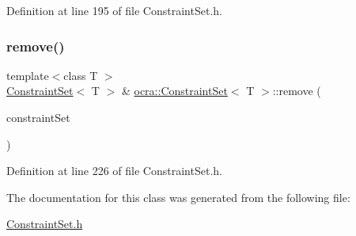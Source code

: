 Definition at line 195 of file Constraint\+Set.\+h.

\hypertarget{classocra_1_1ConstraintSet_a78f8d0f6f919734bb915bf6f63f5f058}{}\label{classocra_1_1ConstraintSet_a78f8d0f6f919734bb915bf6f63f5f058} 
\subsubsection{\texorpdfstring{remove()}{remove()}\hspace{0.1cm}{\footnotesize\ttfamily [2/2]}}
{\footnotesize\ttfamily template$<$class T $>$ \\
\hyperlink{classocra_1_1ConstraintSet}{Constraint\+Set}$<$ T $>$ \& \hyperlink{classocra_1_1ConstraintSet}{ocra\+::\+Constraint\+Set}$<$ T $>$\+::remove (\begin{DoxyParamCaption}\item[{\hyperlink{classocra_1_1ConstraintSet}{Constraint\+Set}$<$ T $>$ \&}]{constraint\+Set }\end{DoxyParamCaption})\hspace{0.3cm}{\ttfamily [inline]}}



Definition at line 226 of file Constraint\+Set.\+h.



The documentation for this class was generated from the following file\+:\begin{DoxyCompactItemize}
\item 
\hyperlink{ConstraintSet_8h}{Constraint\+Set.\+h}\end{DoxyCompactItemize}

